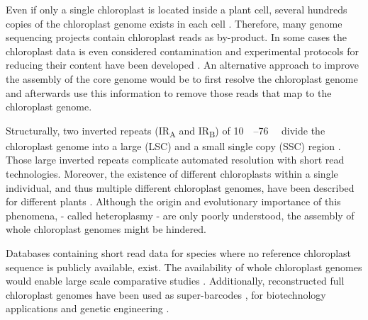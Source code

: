 \documentclass{bmcart}
\newcounter{todocounter}
\newcommand{\ff}[1]
{\stepcounter{todocounter}
 \todo[color=blue!40,author=For Frank]{\thetodocounter: #1}
 }
\newcommand{\ak}[1]
{\stepcounter{todocounter}
 \todo[color=green!40,author=Arthur]{\thetodocounter: #1}
 }
\newcommand{\genename}[1]{\textit{#1}}
\begin{document}
Even if only a single chloroplast is located inside a plant cell, several hundreds copies of the chloroplast genome exists in each cell \cite{kumar_2014,bendich_1987}.
Therefore, many genome sequencing projects contain chloroplast reads as by-product.
In some cases the chloroplast data is even considered contamination and experimental protocols for reducing their content have been developed \cite{lutz_isolation_2011}.
An alternative approach to improve the assembly of the core genome would be to first resolve the chloroplast genome and afterwards use this information to remove those reads that map to the chloroplast genome.

Structurally, two inverted repeats (IR\textsubscript{A} and IR\textsubscript{B}) of \SIrange{10}{76}{\kilo\basepair} divide the chloroplast genome into a large (LSC) and a small single copy (SSC) region \cite{palmer_1985}.
Those large inverted repeats complicate automated resolution with short read technologies\cite{Wang2018}.
Moreover, the existence of different chloroplasts within a single individual, and thus multiple different chloroplast genomes, have been described for different plants \cite{corriveau_1988,Chat2002,Scar2016}.
Although the origin and evolutionary importance of this phenomena, - called heteroplasmy - are only poorly understood, the assembly of whole chloroplast genomes might be hindered.  

Databases containing short read data for species where no reference chloroplast sequence is publicly available, exist. 
The availability of whole chloroplast genomes would enable large scale comparative studies \cite{tonti-filippini_what_2017}.
Additionally, reconstructed full chloroplast genomes have been used as super-barcodes \cite{coissac_barcodes_2016}, for biotechnology applications and genetic engineering \cite{daniell_chloroplast_2016}.

%
\end{document}
